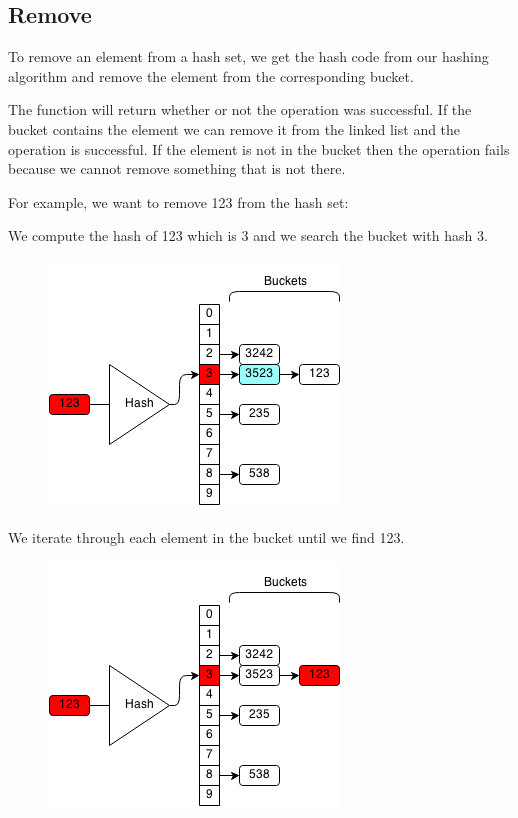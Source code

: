 \documentclass[11pt,oneside]{book}
\makeatletter
\def\maxwidth#1{\ifdim\Gin@nat@width>#1 #1\else\Gin@nat@width\fi}
\makeatother
\begin{document}
\subsection{Remove}

To remove an element from a hash set, we get the hash code from our hashing algorithm and remove the element from the corresponding bucket.

The function will return whether or not the operation was successful. If the bucket contains the element we can remove it from the linked list and the operation is successful. If the element is not in the bucket then the operation fails because we cannot remove something that is not there.

For example, we want to remove 123 from the hash set:

We compute the hash of 123 which is 3 and we search the bucket with hash 3.

\vspace{5px}\begin{figure}[H]\centering
        \includegraphics[width=0.66\maxwidth{\textwidth}]{hashsetrem.png}
        \end{figure}

We iterate through each element in the bucket until we find 123.

\vspace{5px}\begin{figure}[H]\centering
        \includegraphics[width=0.66\maxwidth{\textwidth}]{hashsetrem2.png}
        \end{figure}
\end{document}
